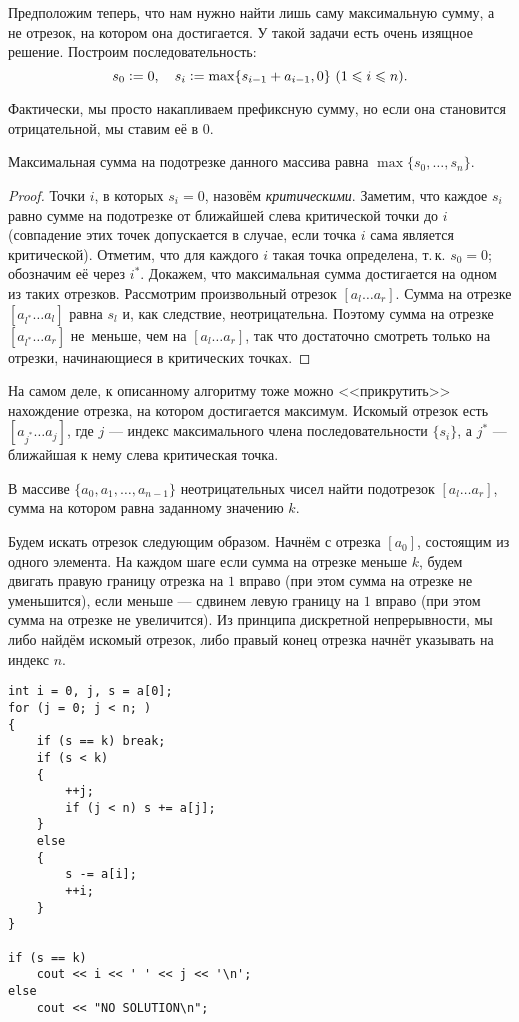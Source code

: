 Предположим теперь, что нам нужно найти лишь саму максимальную сумму, а не отрезок, на котором она достигается. У такой задачи есть очень изящное решение. Построим последовательность:
\[
    s_0 \vcentcolon = 0,\quad s_i \vcentcolon = \max\{s_{i - 1} + a_{i - 1}, 0\}\ (1 \leqslant i \leqslant n).
\]

Фактически, мы просто накапливаем префиксную сумму, но если она становится отрицательной, мы ставим её в $0$.

\begin{statement}
    Максимальная сумма на подотрезке данного массива равна $\max\{s_0, \ldots, s_n\}$.
\end{statement}

\begin{proof}
    Точки $i$, в которых $s_i = 0$, назовём \textit{критическими}. Заметим, что каждое $s_i$ равно сумме на подотрезке от ближайшей слева критической точки до $i$ (совпадение этих точек допускается в случае, если точка $i$ сама является критической). Отметим, что для каждого $i$ такая точка определена, т.\,к. $s_0 = 0$; обозначим её через $i^\ast$. Докажем, что максимальная сумма достигается на одном из таких отрезков. \mbox{Рассмотрим} произвольный отрезок $[a_l\ldots a_r]$. Сумма на отрезке $[a_{l^\ast}\ldots a_l]$ равна $s_l$ и, как следствие, неотрицательна. Поэтому сумма на отрезке $[a_{l^\ast}\ldots a_r]$ не~меньше, чем на $[a_l\ldots a_r]$, так что достаточно смотреть только на отрезки, начинающиеся в критических точках.
\end{proof}

На самом деле, к описанному алгоритму тоже можно <<прикрутить>> нахождение отрезка, на котором достигается максимум. Искомый отрезок есть $[a_{j^\ast}\ldots a_j]$, где $j$ --- индекс максимального члена последовательности $\{s_i\}$, а $j^\ast$ --- ближайшая к нему слева критическая точка.

\begin{problem}
    В массиве $\{a_0, a_1, \ldots, a_{n - 1}\}$ неотрицательных чисел найти подотрезок $[a_l\ldots a_r]$, сумма на котором равна заданному значению $k$.
\end{problem}

Будем искать отрезок следующим образом. Начнём с отрезка $[a_0]$, \mbox{состоящим} из одного элемента. На каждом шаге если сумма на \mbox{отрезке} меньше $k$, будем двигать правую границу отрезка на $1$ вправо (при этом сумма на отрезке не уменьшится), если меньше --- сдвинем левую \mbox{границу} на $1$ вправо (при этом сумма на отрезке не увеличится). Из \mbox{принципа} \mbox{дискретной} непрерывности, мы либо найдём искомый отрезок, либо правый конец отрезка начнёт указывать на индекс $n$.

\begin{verbatim}
int i = 0, j, s = a[0];
for (j = 0; j < n; )
{
    if (s == k) break;
    if (s < k)
    {
        ++j;
        if (j < n) s += a[j];
    }
    else
    {
        s -= a[i];
        ++i;
    }
}

if (s == k)
    cout << i << ' ' << j << '\n';
else
    cout << "NO SOLUTION\n";
\end{verbatim}
